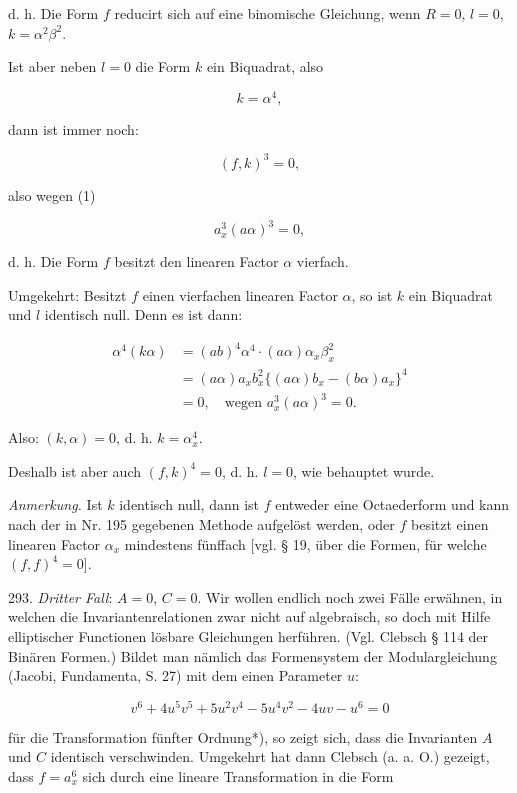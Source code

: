 \documentclass[11pt]{article}
\providecommand{\weberpage}[1]{}
\providecommand{\weq}[2]{\begin{equation}\tag{#1}#2\end{equation}}
\begin{document}
d. h. \glqq Die Form $f$ reducirt sich auf eine binomische Gleichung, wenn $R=0$, $l=0$, $k=\alpha^2\beta^2$.\grqq{}

Ist aber neben $l=0$ die Form $k$ ein Biquadrat, also

\weq{1}{k = \alpha^4,}

dann ist immer noch:

\[
(f, k)^3 = 0,
\]

also wegen (1)

\[
a_x^3(a\alpha)^3 = 0,
\]

d. h. \glqq Die Form $f$ besitzt den linearen Factor $\alpha$ vierfach.\grqq{}

Umgekehrt: Besitzt $f$ einen vierfachen linearen Factor $\alpha$, so ist $k$ ein Biquadrat und $l$ identisch null. Denn es ist dann:


\weberpage{318}

\[
\begin{aligned}
\alpha^4(k\alpha) &= (ab)^4\alpha^4\cdot(a\alpha)\alpha_x\beta_x^2\\
&= (a\alpha)a_xb_x^2\{(a\alpha)b_x - (b\alpha)a_x\}^4\\
&= 0, \quad \text{wegen } a_x^3(a\alpha)^3 = 0.
\end{aligned}
\]

Also: $(k, \alpha) = 0$, d. h. $k = \alpha_x^4$.

Deshalb ist aber auch $(f, k)^4 = 0$, d. h. $l = 0$, wie behauptet wurde.

\textit{Anmerkung.} Ist $k$ identisch null, dann ist $f$ entweder eine Octaederform und kann nach der in Nr. 195 gegebenen Methode aufgelöst werden, oder $f$ besitzt einen linearen Factor $\alpha_x$ mindestens fünffach [vgl. § 19, über die Formen, für welche $(f,f)^4=0$].

293. \textit{Dritter Fall}: $A=0$, $C=0$. Wir wollen endlich noch zwei Fälle erwähnen, in welchen die Invariantenrelationen zwar nicht auf algebraisch, so doch mit Hilfe elliptischer Functionen lösbare Gleichungen herführen. (Vgl. Clebsch § 114 der \glqq Binären Formen\grqq{}.) Bildet man nämlich das Formensystem der Modulargleichung (Jacobi, \glqq Fundamenta\grqq{}, S. 27) mit dem einen Parameter $u$:

\weq{1}{v^6 + 4u^5v^5 + 5u^2v^4 - 5u^4v^2 - 4uv - u^6 = 0}

für die Transformation fünfter Ordnung*), so zeigt sich, dass die Invarianten $A$ und $C$ identisch verschwinden. Umgekehrt hat dann Clebsch (a. a. O.) gezeigt, dass $f = a_x^6$ sich durch eine lineare Transformation in die Form
\end{document}
